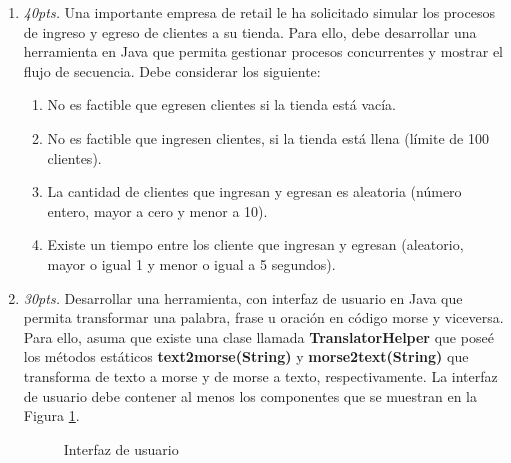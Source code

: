 \documentclass[10pt]{article}
\begin{document}
{\begin{enumerate}
\begin{multicols}{2}
\end{multicols}

\newpage

\item \emph{40pts.} Una importante empresa de retail le ha solicitado simular los procesos de ingreso y egreso de clientes a su tienda. Para ello, debe desarrollar una herramienta en Java que permita gestionar procesos concurrentes y mostrar el flujo de secuencia. Debe considerar los siguiente:

    \begin{enumerate}[label=(\alph*)]
        \item No es factible que egresen clientes si la tienda est\'a vac\'ia.
        \item No es factible que ingresen clientes, si la tienda est\'a llena (l\'imite de 100 clientes). 
        \item La cantidad de clientes que ingresan y egresan es aleatoria (n\'umero entero, mayor a cero y menor a 10).
        \item Existe un tiempo entre los cliente que ingresan y egresan (aleatorio, mayor o igual 1 y menor o igual a 5 segundos).
	\end{enumerate}

\newpage

\item \emph{30pts.} Desarrollar una herramienta, con interfaz de usuario en Java que permita transformar una palabra, frase u oraci\'on en c\'odigo morse y viceversa. Para ello, asuma que existe una clase llamada \textbf{TranslatorHelper} que pose\'e los m\'etodos est\'aticos \textbf{text2morse(String)} y \textbf{morse2text(String)} que transforma de texto a morse y de morse a texto, respectivamente. La interfaz de usuario debe contener al menos los componentes que se muestran en la Figura \ref{fig:graf-user-mt}.

    \begin{figure}[h]
        \begin{center}
            \caption{Interfaz de usuario}\label{fig:graf-user-mt}
        \end{center}
    \end{figure}


\end{enumerate}
}
\end{document}
